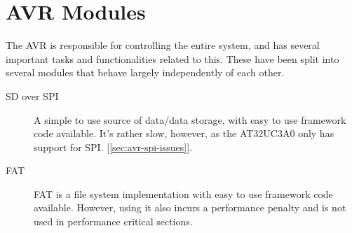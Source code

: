 \section{AVR Modules}


The AVR is responsible for controlling the entire system, and has several
important tasks and functionalities related to this. These have been split
into several modules that behave largely independently of each other.
\begin{description}

\item[SD over SPI] A simple to use source of data/data storage, with easy to use
  framework code available. It's rather slow, however, as the AT32UC3A0 only has
  support for \ac{SPI}. [\ref{sec:avr-spi-issues}].


\item[FAT] \ac{FAT} is a file system implementation with easy to use framework
  code available. However, using it also incurs a performance penalty and is not
  used in performance critical sections.



\end{description}
